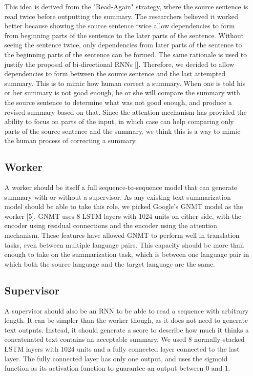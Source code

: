 \documentclass[letterpaper]{article} %
\begin{document}
This idea is derived from the "Read-Again" strategy, where the source sentence is read twice before outputting the summary. The researchers believed it worked better because showing the source sentence twice allow dependencies to form from beginning parts of the sentence to the later parts of the sentence. Without seeing the sentence twice, only dependencies from later parts of the sentence to the beginning parts of the sentence can be formed. The same rationale is used to justify the proposal of bi-directional RNNs []. Therefore, we decided to allow dependencies to form between the source sentence and the last attempted summary. This is to mimic how human correct a summary. When one is told his or her summary is not good enough, he or she will compare the summary with the source sentence to determine what was not good enough, and produce a revised summary based on that. Since the attention mechanism has provided the ability to focus on parts of the input, in which case can help comparing only parts of the source sentence and the summary, we think this is a way to mimic the human process of correcting a summary.

\subsection{Worker}
A worker should be itself a full sequence-to-sequence model that can generate summary with or without a supervisor. As any existing text summarization model should be able to take this role, we picked Google’s GNMT model as the worker [5]. GNMT uses 8 LSTM layers with 1024 units on either side, with the encoder using residual connections and the encoder using the attention mechanism. These features have allowed GNMT to perform well in translation tasks, even between multiple language pairs. This capacity should be more than enough to take on the summarization task, which is between one language pair in which both the source language and the target language are the same.

\subsection{Supervisor}
A supervisor should also be an RNN to be able to read a sequence with arbitrary length. It can be simpler than the worker though, as it does not need to generate text outputs. Instead, it should generate a score to describe how much it thinks a concatenated text contains an acceptable summary. We used 8 normally-stacked LSTM layers with 1024 units and a fully connected layer connected to the last layer. The fully connected layer has only one output, and uses the sigmoid function as its activation function to guarantee an output between 0 and 1.
\end{document}
